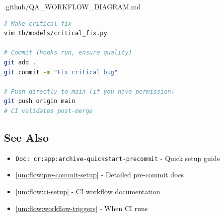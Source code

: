 \begin{relocated}{.github/QA_WORKFLOW_DIAGRAM.md}
\begin{lstlisting}[language=bash]
# Make critical fix
vim tb/models/critical_fix.py

# Commit (hooks run, ensure quality)
git add .
git commit -m "Fix critical bug"

# Push directly to main (if you have permission)
git push origin main
# CI validates post-merge
\end{lstlisting}

\subsection{See Also}\label{um:flow:qa-workflow-diagram:see-also}

\begin{itemize}
\tightlist
\item
  \texttt{Doc:\allowbreak{}\ cr:\allowbreak{}app:\allowbreak{}archive-\allowbreak{}quickstart-\allowbreak{}precommit}
  - Quick setup guide
\item
  \cref{um:flow:pre-commit-setup} - Detailed pre-commit docs
\item
  \cref{um:flow:ci-setup} - CI workflow documentation
\item
  \cref{um:flow:workflow-triggers} - When CI runs
\end{itemize}
\end{relocated}

